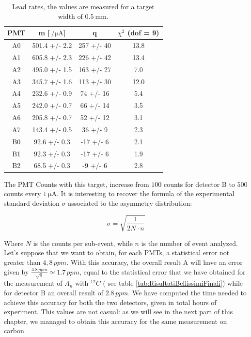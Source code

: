 \begin{table}[]
\centering
\begin{tabular}{cccc}
\hline
 PMT   & m [$\SI{}{ \per \micro \ampere}$]          & q                &  $\chi^{2}$ (dof = 9) \\
\hline
 A0    & 501.4 +/- 2.2 & 257 +/- 40 & 13.8  \\
 A1    & 605.8 +/- 2.3 & 226 +/- 42 & 13.4  \\
 A2    & 495.0 +/- 1.5 & 163 +/- 27 &  7.0  \\
 A3    & 345.7 +/- 1.6  & 113 +/- 30  & 12.0 \\
 A4    & 232.6 +/- 0.9  & 74 +/- 16  &  5.4 \\
 A5    & 242.0 +/- 0.7 & 66 +/- 14  &  3.5  \\
 A6    & 205.8 +/- 0.7 & 52 +/- 12  &  3.1  \\
 A7    & 143.4 +/- 0.5 & 36 +/- 9   &  2.3  \\
 B0    & 92.6 +/- 0.3  & -17 +/- 6  &  2.1  \\
 B1    & 92.3 +/- 0.3  & -17 +/- 6   &  1.9  \\
 B2    & 68.5 +/- 0.3  & -9 +/- 6   &  2.8  \\
\hline
\end{tabular}
\caption{Lead rates, the values are measured for a target width of $\SI{0.5}{\milli \meter}$.}
\label{tab:LeadRates}
\end{table}

The PMT Counts with this target, increase from $100$ counts for detector B to $500$ counts every $\SI{1}{\micro \ampere}$. It is interesting to recover the formula of the experimental standard deviation $\sigma$ associated to the asymmetry distribution:

\begin{equation}
\sigma = \sqrt{\dfrac{1}{2 N \cdot n}}
\end{equation}

Where $N$ is the counts per sub-event, while  $n$ is the number of event analyzed.
Let's suppose that we want to obtain, for each PMTs, a statistical error not greater than $4,8 \, ppm$. With this accuracy, the overall result A will have an error given by $\frac{4.8 \, ppm}{\sqrt{8}} \simeq 1.7 \, ppm$, equal to the statistical error that we have obtained for the measurement of $A_{n}$ with $^{12}C$ ( see table \ref{tab:RisultatiBellissimiFinali}) while for detector B an overall result of $2.8 \, ppm$.
We have computed the time needed to achieve this accuracy for both the two detectors, given in total hours of experiment. This values are not casual: as we will see in the next part of this chapter, we managed to obtain this accuracy for the same measurement on carbon  

